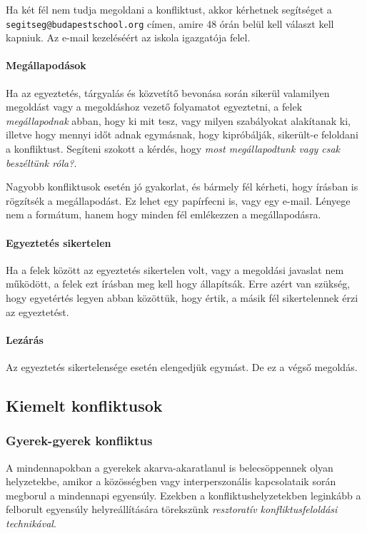 Ha két fél nem tudja megoldani a konfliktust, akkor kérhetnek segítséget a \texttt{segitseg@budapestschool.org} címen, amire 48 órán belül kell választ kell kapniuk. Az e-mail kezeléséért az iskola igazgatója felel.

\paragraph{Megállapodások}

Ha az egyeztetés, tárgyalás és közvetítő bevonása során sikerül valamilyen megoldást vagy a megoldáshoz vezető folyamatot egyeztetni, a felek \emph{megállapodnak} abban, hogy ki mit tesz, vagy milyen szabályokat alakítanak ki, illetve hogy mennyi időt adnak egymásnak, hogy kipróbálják, sikerült-e feloldani a konfliktust. Segíteni szokott a kérdés, hogy \emph{most megállapodtunk vagy csak beszéltünk róla?}.

Nagyobb konfliktusok esetén jó gyakorlat, és bármely fél kérheti, hogy írásban is rögzítsék a megállapodást. Ez lehet egy papírfecni is, vagy egy e-mail. Lényege nem a formátum, hanem  hogy minden fél emlékezzen a megállapodásra.

\paragraph{Egyeztetés sikertelen}

Ha a felek között az egyeztetés sikertelen volt, vagy a megoldási javaslat nem működött, a felek ezt írásban meg kell hogy állapítsák. Erre azért van szükség, hogy egyetértés legyen abban közöttük, hogy értik, a másik fél sikertelennek érzi az egyeztetést.

\paragraph{Lezárás}

Az egyeztetés sikertelensége esetén elengedjük egymást. De ez a végső megoldás.

\subsection{Kiemelt konfliktusok}

\subsubsection{Gyerek-gyerek konfliktus}

A mindennapokban a gyerekek akarva-akaratlanul is belecsöppennek olyan hely\-ze\-tek\-be, amikor a közösségben vagy interperszonális kapcsolataik során megborul a mindennapi egyensúly. Ezekben a konfliktushelyzetekben leginkább a felborult egyensúly helyreállítására törekszünk \emph{resztoratív konfliktusfeloldási technikával}.

